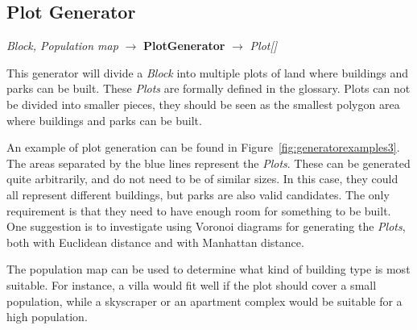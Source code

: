\subsection{Plot Generator}
\begin{center}
    \textit{Block, Population map} $\rightarrow$ \textbf{PlotGenerator} $\rightarrow$ \textit{Plot{[}{]}}
\end{center}
This generator will divide a \textit{Block} into multiple plots of land where buildings and parks can be built.
These \textit{Plots} are formally defined in the glossary.
Plots can not be divided into smaller pieces, they should be seen as the smallest polygon area where buildings and parks can be built.

An example of plot generation can be found in Figure~\ref{fig:generatorexamples3}.
The areas separated by the blue lines represent the \textit{Plots}.
These can be generated quite arbitrarily, and do not need to be of similar sizes.
In this case, they could all represent different buildings, but parks are also valid candidates.
The only requirement is that they need to have enough room for something to be built.
One suggestion is to investigate using Voronoi diagrams for generating the \textit{Plots}, both with Euclidean distance and with Manhattan distance.

The population map can be used to determine what kind of building type is most suitable.
For instance, a villa would fit well if the plot should cover a small population, while a skyscraper or an apartment complex would be suitable for a high population.
